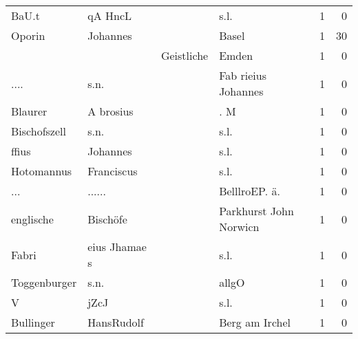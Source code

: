\begin{tabular}{llllrr}
                    BaU.t &                            qA HncL &             &                                        s.l. &          1 &         0 \\
                   Oporin &                           Johannes &             &                                       Basel &          1 &        30 \\
                          &                                    &  Geistliche &                                       Emden &          1 &         0 \\
                     .... &                               s.n. &             &                         Fab rieius Johannes &          1 &         0 \\
                  Blaurer &                          A brosius &             &                                         . M &          1 &         0 \\
             Bischofszell &                               s.n. &             &                                        s.l. &          1 &         0 \\
                    ffius &                           Johannes &             &                                        s.l. &          1 &         0 \\
               Hotomannus &                         Franciscus &             &                                        s.l. &          1 &         0 \\
                      ... &                             ...... &             &                              BelllroEP. ä.  &          1 &         0 \\
                englische &                           Bischöfe &             &                      Parkhurst John Norwicn &          1 &         0 \\
                    Fabri &                      eius Jhamae s &             &                                        s.l. &          1 &         0 \\
             Toggenburger &                               s.n. &             &                                       allgO &          1 &         0 \\
                        V &                               jZcJ &             &                                        s.l. &          1 &         0 \\
                Bullinger &                         HansRudolf &             &                              Berg am Irchel &          1 &         0 \\

\end{tabular}
